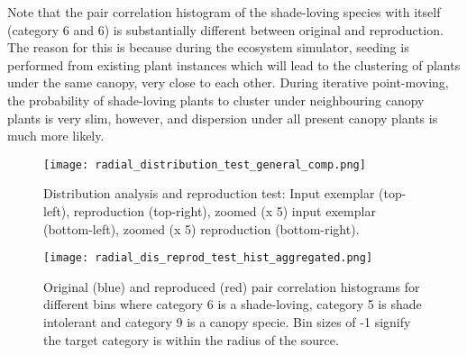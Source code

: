 Note that the pair correlation histogram of the shade-loving species with itself (category 6 and 6) is substantially different between original and reproduction. The reason for this is because during the ecosystem simulator, seeding is performed from existing plant instances which will lead to the clustering of plants under the same canopy, very close to each other. During iterative point-moving, the probability of shade-loving plants to cluster under neighbouring canopy plants is very slim, however, and dispersion under all present canopy plants is much more likely.

\begin{figure}
\center
	\texttt{[image: radial\_distribution\_test\_general\_comp.png]}
	\caption{ Distribution analysis and reproduction test: Input exemplar (top-left), reproduction (top-right), zoomed (x 5) input exemplar (bottom-left), zoomed (x 5) reproduction (bottom-right). }	
	\label{fig:radial_dist_test}
\end{figure}

\begin{figure}
\center
	\texttt{[image: radial\_dis\_reprod\_test\_hist\_aggregated.png]}
	\caption{ Original (blue) and reproduced (red) pair correlation histograms for different bins where category 6 is a shade-loving, category 5 is shade intolerant and category 9 is a canopy specie. Bin sizes of -1 signify the target category is within the radius of the source.}	
	\label{fig:hisogram_comp}
\end{figure}
